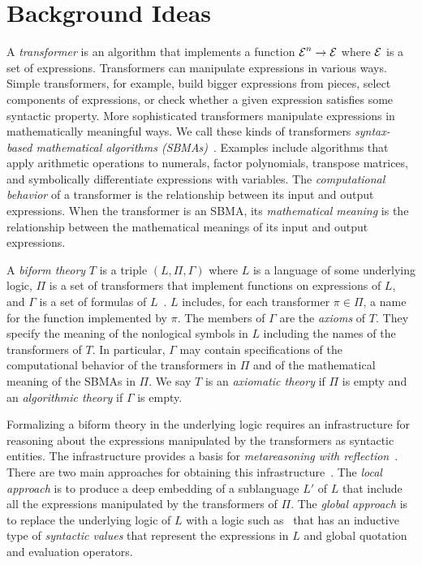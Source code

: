 \documentclass[fleqn]{llncs}
\begin{document}
\section{Background Ideas}

A \emph{transformer} is an algorithm that implements a function $\mbox{$\cal E$}^n
\rightarrow \mbox{$\cal E$}$ where $\mbox{$\cal E$}$ is a set of expressions.  Transformers can
manipulate expressions in various ways.  Simple transformers, for
example, build bigger expressions from pieces, select components of
expressions, or check whether a given expression satisfies some
syntactic property.  More sophisticated transformers manipulate
expressions in mathematically meaningful ways.  We call these kinds of
transformers \emph{syntax-based mathematical algorithms
  (SBMAs)}~\cite{Farmer13}.  Examples include algorithms that apply
arithmetic operations to numerals, factor polynomials, transpose
matrices, and symbolically differentiate expressions with variables.
The \emph{computational behavior} of a transformer is the relationship
between its input and output expressions.  When the transformer is an
SBMA, its \emph{mathematical meaning} is the relationship between the
mathematical meanings of its input and output expressions.

A \emph{biform theory} $T$ is a triple $(L,\Pi,\Gamma)$ where $L$ is a
language of some underlying logic, $\Pi$ is a set of transformers that
implement functions on expressions of $L$, and $\Gamma$ is a set of
formulas of
$L$~\cite{CaretteFarmer08,Farmer07b,FarmerMohrenschildt03}.  $L$
includes, for each transformer $\pi \in \Pi$, a name for the function
implemented by $\pi$.  The members of $\Gamma$ are the \emph{axioms}
of $T$.  They specify the meaning of the nonlogical symbols in $L$
including the names of the transformers of $T$.  In particular,
$\Gamma$ may contain specifications of the computational behavior of
the transformers in $\Pi$ and of the mathematical meaning of the SBMAs
in $\Pi$.  We say $T$ is an \emph{axiomatic theory} if $\Pi$ is empty
and an \emph{algorithmic theory} if $\Gamma$ is empty.

Formalizing a biform theory in the underlying logic requires an
infrastructure for reasoning about the expressions manipulated by the
transformers as syntactic entities.  The infrastructure provides a
basis for \emph{metareasoning with reflection}~\cite{FarmerArxiv16}.
There are two main approaches for obtaining this
infrastructure~\cite{Farmer13}.  The \emph{local approach} is to
produce a deep embedding of a sublanguage $L'$ of $L$ that include all
the expressions manipulated by the transformers of $\Pi$.  The
\emph{global approach} is to replace the underlying logic of $L$ with
a logic such as~\cite{FarmerArxiv16} that has an inductive
type of \emph{syntactic values} that represent the expressions in $L$
and global quotation and evaluation operators.
\end{document}

